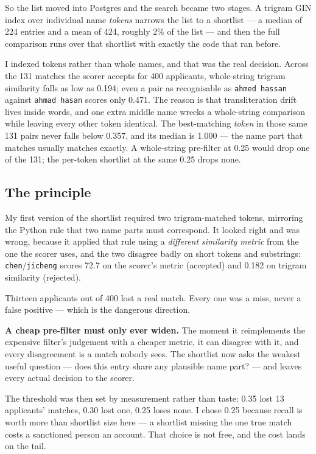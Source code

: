 \documentclass[11pt,a4paper]{article}
\begin{document}
So the list moved into Postgres and the search became two stages. A trigram GIN
index over individual name \emph{tokens} narrows the list to a shortlist ---
a median of 224 entries and a mean of 424, roughly 2\% of the list --- and then
the full comparison runs over that shortlist with exactly the code that ran
before.

I indexed tokens rather than whole names, and that was the real decision.
Across the 131 matches the scorer accepts for 400 applicants, whole-string
trigram similarity falls as low as 0.194; even a pair as recognisable as
\texttt{ahmed hassan} against \texttt{ahmad hasan} scores only 0.471. The reason
is that transliteration drift lives inside words, and one extra middle name
wrecks a whole-string comparison while leaving every other token identical. The
best-matching \emph{token} in those same 131 pairs never falls below 0.357, and
its median is 1.000 --- the name part that matches usually matches exactly. A
whole-string pre-filter at 0.25 would drop one of the 131; the per-token
shortlist at the same 0.25 drops none.

\subsection{The principle}

My first version of the shortlist required two trigram-matched tokens, mirroring
the Python rule that two name parts must correspond. It looked right and was
wrong, because it applied that rule using a \emph{different similarity metric}
from the one the scorer uses, and the two disagree badly on short tokens and
substrings: \texttt{chen}/\texttt{jicheng} scores 72.7 on the scorer's metric
(accepted) and 0.182 on trigram similarity (rejected).

Thirteen applicants out of 400 lost a real match. Every one was a miss, never a
false positive --- which is the dangerous direction.

\textbf{A cheap pre-filter must only ever widen.} The moment it reimplements the
expensive filter's judgement with a cheaper metric, it can disagree with it, and
every disagreement is a match nobody sees. The shortlist now asks the weakest
useful question --- does this entry share any plausible name part? --- and leaves
every actual decision to the scorer.

The threshold was then set by measurement rather than taste: 0.35 lost 13
applicants' matches, 0.30 lost one, 0.25 loses none. I chose 0.25 because recall
is worth more than shortlist size here --- a shortlist missing the one true
match costs a sanctioned person an account. That choice is not free, and the
cost lands on the tail.
\end{document}

